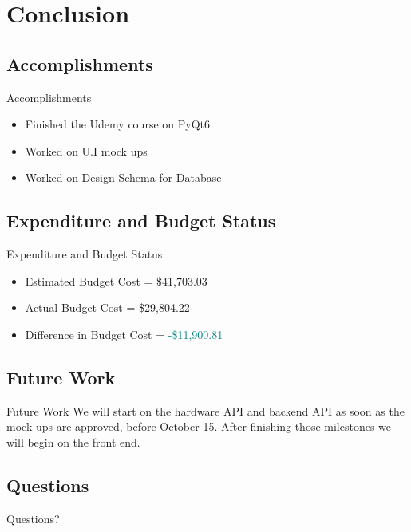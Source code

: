 \documentclass[17pt, aspectratio=169]{beamer}
\begin{document}
\section{Conclusion}
\subsection{Accomplishments}
\begin{frame}{Accomplishments}
	\begin{itemize}
		\item Finished the Udemy course on PyQt6
		\item Worked on U.I mock ups
		\item Worked on Design Schema for Database
	\end{itemize}
\end{frame}
\subsection*{Expenditure and Budget Status}
\begin{frame}{Expenditure and Budget Status}
\begin{itemize}
	\item Estimated Budget Cost = \$41,703.03 
	\item Actual Budget Cost = \$29,804.22 
	\item Difference in Budget Cost = \textcolor{teal}{-\$11,900.81}
\end{itemize}
\end{frame}
\subsection{Future Work}
\begin{frame}{Future Work}
We will start on the hardware API and backend API as soon as the mock ups are approved, before October 15. After finishing those milestones we will begin on the front end.
\end{frame}
\subsection*{Questions}
\begin{frame}
	\begin{huge}
	\begin{center}
		Questions?
	\end{center} 
\end{huge}
	\end{frame}
\end{document}
